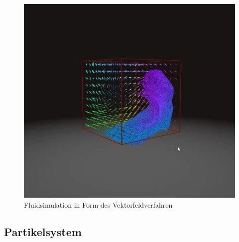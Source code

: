 \documentclass[intern,palatino]{cgBA}
\begin{document}
\begin{figure}[h]
	\centering
	\includegraphics[width=0.7\columnwidth]{Bilder/vektorfeld.jpg}
	\caption[Fluidsimulation in Form des Vektorfeldverfahren \newline Quelle:\url{https://thumbs.gfycat.com/CelebratedElasticHartebeest-poster.jpg}]{Fluidsimulation in Form des Vektorfeldverfahren}
	\label{img:Vertexfeld}
\end{figure}


\subsection{Partikelsystem}\label{partikel}
\end{document}
